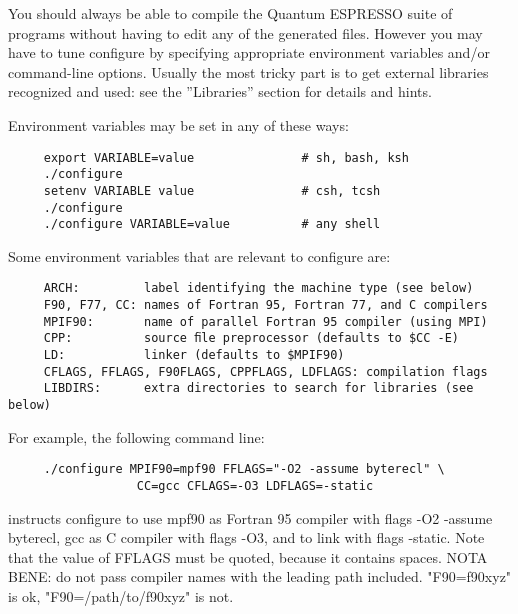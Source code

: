 \documentclass[12pt,a4paper]{article}
\begin{document}
You should always be able to compile the Quantum ESPRESSO suite
of programs without having to edit any of the generated files. However you
may have to tune configure by specifying appropriate environment variables
and/or command-line options. Usually the most tricky part is to get external
libraries recognized and used: see the ''Libraries''
section for details and hints.

Environment variables may be set in any of these ways:
\begin{verbatim}
     export VARIABLE=value               # sh, bash, ksh
     ./configure
     setenv VARIABLE value               # csh, tcsh
     ./configure
     ./configure VARIABLE=value          # any shell
\end{verbatim}
Some environment variables that are relevant to configure are:
\begin{verbatim}
     ARCH:         label identifying the machine type (see below)
     F90, F77, CC: names of Fortran 95, Fortran 77, and C compilers
     MPIF90:       name of parallel Fortran 95 compiler (using MPI)
     CPP:          source ﬁle preprocessor (defaults to $CC -E)
     LD:           linker (defaults to $MPIF90)
     CFLAGS, FFLAGS, F90FLAGS, CPPFLAGS, LDFLAGS: compilation flags
     LIBDIRS:      extra directories to search for libraries (see below)
\end{verbatim}
For example, the following command line:
\begin{verbatim}
     ./configure MPIF90=mpf90 FFLAGS="-O2 -assume byterecl" \
                  CC=gcc CFLAGS=-O3 LDFLAGS=-static
\end{verbatim}
instructs configure to use mpf90 as Fortran 95 compiler with flags -O2
-assume byterecl, gcc as C compiler with flags -O3, and to link with flags
-static. Note that the value of FFLAGS must be quoted, because it contains
spaces. NOTA BENE: do not pass compiler names with the leading path
included. "F90=f90xyz" is ok, "F90=/path/to/f90xyz" is not.
\end{document}
